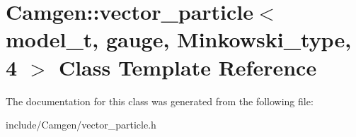 \hypertarget{a00583}{}\section{Camgen\+:\+:vector\+\_\+particle$<$ model\+\_\+t, gauge, Minkowski\+\_\+type, 4 $>$ Class Template Reference}
\label{a00583}


The documentation for this class was generated from the following file\+:\begin{DoxyCompactItemize}
\item 
include/\+Camgen/vector\+\_\+particle.\+h\end{DoxyCompactItemize}
